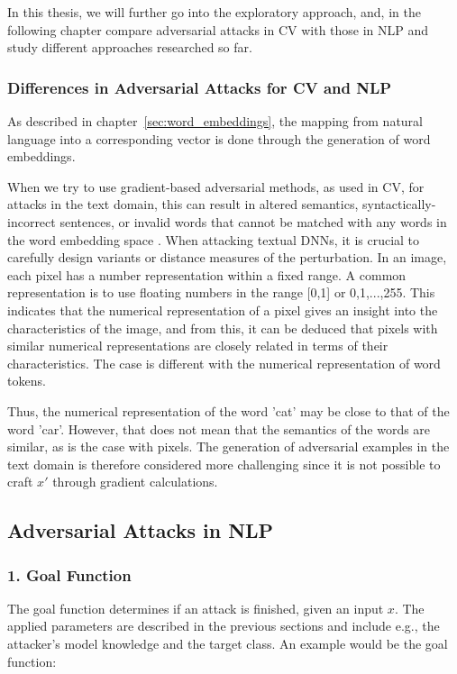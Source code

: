 In this thesis, we will further go into the exploratory approach, and, in the following chapter compare adversarial attacks in CV with those in NLP and study different approaches researched so far.

\subsubsection{Differences in Adversarial Attacks for CV and NLP}
    \label{sec:differences_in_adv-ex}

As described in chapter~\ref{sec:word_embeddings}, the mapping from natural language into a corresponding vector is done through the generation of word embeddings.

When we try to use gradient-based adversarial methods, as used in CV, for attacks in the text domain, this can result in altered semantics, syntactically-incorrect sentences, or invalid words that cannot be matched with any words in the word embedding space  \cite{zhang2019adversarial}. When attacking textual DNNs, it is crucial to carefully design variants or distance measures of the perturbation.
In an image, each pixel has a number representation within a fixed range.  A common representation is to use floating numbers in the range [0,1] or {0,1,...,255}. This indicates that the numerical representation of a pixel gives an insight into the characteristics of the image, and from this, it can be deduced that pixels with similar numerical representations are closely related in terms of their characteristics.
The case is different with the numerical representation of word tokens. 



Thus, the numerical representation of the word 'cat' may be close to that of the word 'car'.
However, that does not mean that the semantics of the words are similar, as is the case with pixels. The generation of adversarial examples in the text domain is therefore considered more challenging\cite{carlini2018audio} since it is not possible to craft \(x'\) through gradient calculations. 



\subsection{Adversarial Attacks in NLP}
    \label{sec:adv-ex_in_NLP}
\subsubsection{1. Goal Function}
The goal function determines if an attack is finished, given an input $x$. 
The applied parameters are described in the previous sections and include e.g., the attacker's model knowledge and the target class.
An example would be the goal function:

